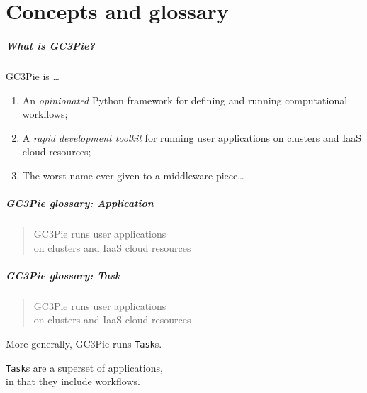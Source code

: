 \documentclass[english,serif,mathserif,usenames,dvipsnames]{beamer}
\begin{document}
\part{Concepts and glossary}

\begin{frame}
  \frametitle{What is GC3Pie?}
  GC3Pie is \ldots
  \begin{enumerate}
  \item \alert<2>{An \emph{opinionated} Python framework for defining and running computational workflows;}
  \item \alert<1>{A \emph{rapid development toolkit} for running user applications on clusters and IaaS cloud resources;}
  \item The worst name ever given to a middleware piece\ldots
  \end{enumerate}

  \+
\end{frame}



\begin{frame}
  \frametitle{GC3Pie glossary: Application}
  \begin{quote}
    GC3Pie runs \alert<2-3>{user applications}
    \\
    on clusters and IaaS cloud resources
  \end{quote}

\end{frame}



\begin{frame}
  \frametitle{GC3Pie glossary: Task}
  \begin{quote}
    GC3Pie \alert{runs} user applications
    \\
    on clusters and IaaS cloud resources
  \end{quote}

  \+ More generally, GC3Pie runs \texttt{Task}s.

  \+ \texttt{Task}s are a superset of applications,
  \\ in that they include workflows.

  \+ \hyperlink{workflows}{}
\end{frame}
\end{document}
